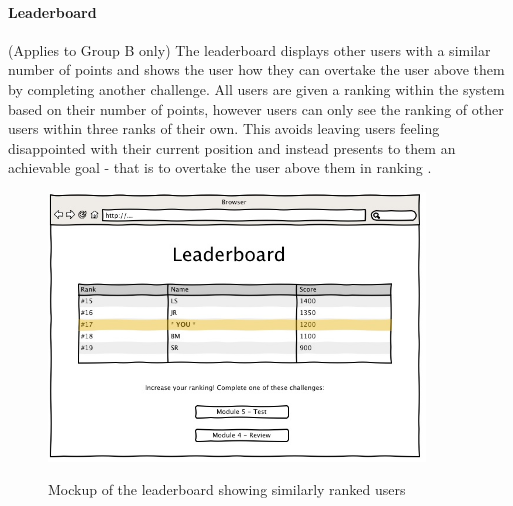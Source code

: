 \paragraph{Leaderboard}
(Applies to Group B only)
The leaderboard displays other users with a similar number of points and shows
the user how they can overtake the user above them by completing another
challenge. All users are given a ranking within the system based on their
number of points, however users can only see the ranking of other users within
three ranks of their own. This avoids leaving users feeling disappointed with
their current position and instead presents to them an achievable goal - that is to
overtake the user above them in ranking \cite{gabe_zichermann_fun_2010}.

\begin{figure}[H]
	\centering
		\includegraphics[width=10cm]{./screens/leaderboard.jpg}\\
		\caption{Mockup of the leaderboard showing similarly ranked users}
\end{figure}
